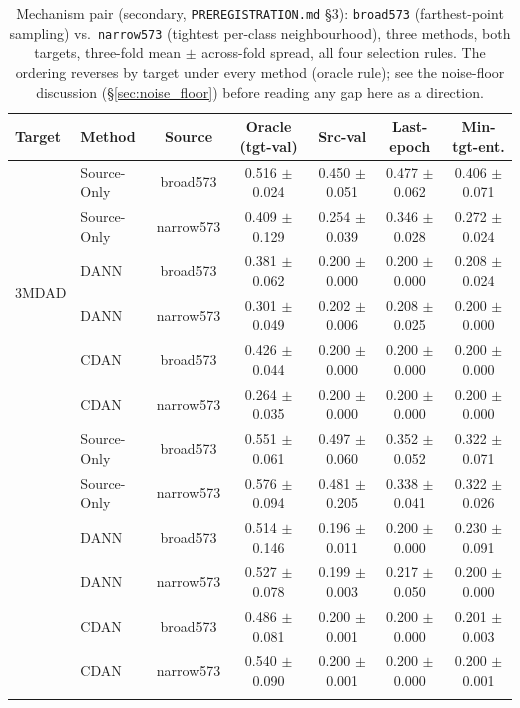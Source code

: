 \begin{table}[t]
\centering
\caption{Mechanism pair (secondary, \texttt{PREREGISTRATION.md} \S3): \texttt{broad573} (farthest-point sampling) vs.\ \texttt{narrow573} (tightest per-class neighbourhood), three methods, both targets, three-fold mean $\pm$ across-fold spread, all four selection rules. The ordering reverses by target under every method (oracle rule); see the noise-floor discussion (\S\ref{sec:noise_floor}) before reading any gap here as a direction.}
\label{tab:mechanism_pair}
\footnotesize
\setlength{\tabcolsep}{4pt}
\begin{tabular}{llccccc}
\toprule
Target & Method & Source & Oracle (tgt-val) & Src-val & Last-epoch & Min-tgt-ent. \\
\midrule
\multirow{6}{*}{3MDAD}
  & Source-Only & broad573 & 0.516 $\pm$ 0.024 & 0.450 $\pm$ 0.051 & 0.477 $\pm$ 0.062 & 0.406 $\pm$ 0.071 \\
  & Source-Only & narrow573 & 0.409 $\pm$ 0.129 & 0.254 $\pm$ 0.039 & 0.346 $\pm$ 0.028 & 0.272 $\pm$ 0.024 \\
\addlinespace[1pt]
  & DANN & broad573 & 0.381 $\pm$ 0.062 & 0.200 $\pm$ 0.000 & 0.200 $\pm$ 0.000 & 0.208 $\pm$ 0.024 \\
  & DANN & narrow573 & 0.301 $\pm$ 0.049 & 0.202 $\pm$ 0.006 & 0.208 $\pm$ 0.025 & 0.200 $\pm$ 0.000 \\
\addlinespace[1pt]
  & CDAN & broad573 & 0.426 $\pm$ 0.044 & 0.200 $\pm$ 0.000 & 0.200 $\pm$ 0.000 & 0.200 $\pm$ 0.000 \\
  & CDAN & narrow573 & 0.264 $\pm$ 0.035 & 0.200 $\pm$ 0.000 & 0.200 $\pm$ 0.000 & 0.200 $\pm$ 0.000 \\
\addlinespace[1pt]
\midrule
\multirow{6}{*}{DMD}
  & Source-Only & broad573 & 0.551 $\pm$ 0.061 & 0.497 $\pm$ 0.060 & 0.352 $\pm$ 0.052 & 0.322 $\pm$ 0.071 \\
  & Source-Only & narrow573 & 0.576 $\pm$ 0.094 & 0.481 $\pm$ 0.205 & 0.338 $\pm$ 0.041 & 0.322 $\pm$ 0.026 \\
\addlinespace[1pt]
  & DANN & broad573 & 0.514 $\pm$ 0.146 & 0.196 $\pm$ 0.011 & 0.200 $\pm$ 0.000 & 0.230 $\pm$ 0.091 \\
  & DANN & narrow573 & 0.527 $\pm$ 0.078 & 0.199 $\pm$ 0.003 & 0.217 $\pm$ 0.050 & 0.200 $\pm$ 0.000 \\
\addlinespace[1pt]
  & CDAN & broad573 & 0.486 $\pm$ 0.081 & 0.200 $\pm$ 0.001 & 0.200 $\pm$ 0.000 & 0.201 $\pm$ 0.003 \\
  & CDAN & narrow573 & 0.540 $\pm$ 0.090 & 0.200 $\pm$ 0.001 & 0.200 $\pm$ 0.000 & 0.200 $\pm$ 0.001 \\
\addlinespace[1pt]
\bottomrule
\end{tabular}
\end{table}

